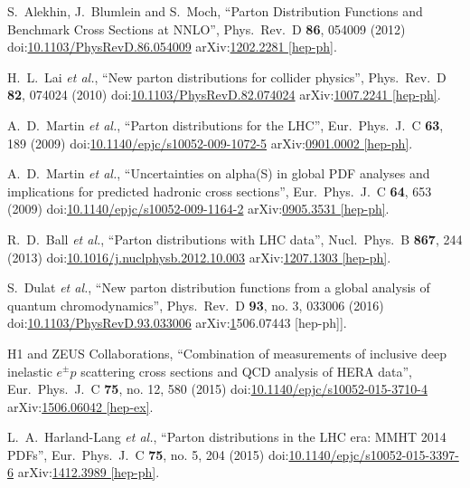 \begin{thebibliography}{99}
S.~Alekhin, J.~Blumlein and S.~Moch, ``Parton Distribution Functions and Benchmark Cross Sections at NNLO'', Phys.\ Rev.\ D {\bf 86}, 054009 (2012) doi:\href{http://dx.doi.org/10.1103/PhysRevD.86.054009}{10.1103/PhysRevD.86.054009} arXiv:\href{https://arxiv.org/abs/1202.2281}{1202.2281 [hep-ph]}.

H.~L.~Lai {\it et al.}, ``New parton distributions for collider physics'', Phys.\ Rev.\ D {\bf 82}, 074024 (2010) doi:\href{http://dx.doi.org/10.1103/PhysRevD.82.074024}{10.1103/PhysRevD.82.074024} arXiv:\href{https://arxiv.org/abs/1007.2241}{1007.2241 [hep-ph]}.

A.~D.~Martin {\it et al.}, ``Parton distributions for the LHC'', Eur.\ Phys.\ J.\ C {\bf 63}, 189 (2009) doi:\href{http://dx.doi.org/10.1140/epjc/s10052-009-1072-5}{10.1140/epjc/s10052-009-1072-5} arXiv:\href{https://arxiv.org/abs/0901.0002}{0901.0002 [hep-ph]}.

A.~D.~Martin {\it et al.}, ``Uncertainties on alpha(S) in global PDF analyses and implications for predicted hadronic cross sections'', Eur.\ Phys.\ J.\ C {\bf 64}, 653 (2009) doi:\href{http://dx.doi.org/10.1140/epjc/s10052-009-1164-2}{10.1140/epjc/s10052-009-1164-2} arXiv:\href{https://arxiv.org/abs/0905.3531}{0905.3531 [hep-ph]}.

R.~D.~Ball {\it et al.}, ``Parton distributions with LHC data'', Nucl.\ Phys.\ B {\bf 867}, 244 (2013) doi:\href{http://dx.doi.org/10.1016/j.nuclphysb.2012.10.003}{10.1016/j.nuclphysb.2012.10.003} arXiv:\href{https://arxiv.org/abs/1207.1303}{1207.1303 [hep-ph]}.

S.~Dulat {\it et al.}, ``New parton distribution functions from a global analysis of quantum chromodynamics'', Phys.\ Rev.\ D {\bf 93}, no. 3, 033006 (2016) doi:\href{http://dx.doi.org/10.1103/PhysRevD.93.033006}{10.1103/PhysRevD.93.033006} arXiv:\href{https://arxiv.org/abs/1506.07443}1506.07443 [hep-ph]].

H1 and ZEUS Collaborations, ``Combination of measurements of inclusive deep inelastic ${e^{\pm }p}$ scattering cross sections and QCD analysis of HERA data'', Eur.\ Phys.\ J.\ C {\bf 75}, no. 12, 580 (2015) doi:\href{http://dx.doi.org/10.1140/epjc/s10052-015-3710-4}{10.1140/epjc/s10052-015-3710-4} arXiv:\href{https://arxiv.org/abs/1506.06042}{1506.06042 [hep-ex]}.

L.~A.~Harland-Lang {\it et al.}, ``Parton distributions in the LHC era: MMHT 2014 PDFs'', Eur.\ Phys.\ J.\ C {\bf 75}, no. 5, 204 (2015) doi:\href{http://dx.doi.org/10.1140/epjc/s10052-015-3397-6}{10.1140/epjc/s10052-015-3397-6} arXiv:\href{https://arxiv.org/abs/1412.3989}{1412.3989 [hep-ph]}.


\end{thebibliography}
